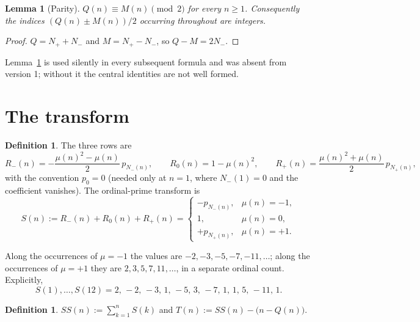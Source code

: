 \documentclass[11pt]{amsart}
\numberwithin{equation}{section}
\theoremstyle{plain}
\newtheorem{lemma}[theorem]{Lemma}
\theoremstyle{definition}
\newtheorem{definition}[theorem]{Definition}
\theoremstyle{remark}
\newcommand{\mob}{\mu}
\newcommand{\Mert}{M}
\newcommand{\Sq}{Q}
\begin{document}
\begin{lemma}[Parity]\label{lem:parity}
$\Sq(n)\equiv \Mert(n)\pmod 2$ for every $n\ge1$. Consequently the indices
$(\Sq(n)\pm\Mert(n))/2$ occurring throughout are integers.
\end{lemma}

\begin{proof}
$\Sq=N_++N_-$ and $\Mert=N_+-N_-$, so $\Sq-\Mert=2N_-$.
\end{proof}

Lemma~\ref{lem:parity} is used silently in every subsequent formula and was
absent from version 1; without it the central identities are not well formed.

\section{The transform}
\label{sec:transform}

\begin{definition}
\label{def:transform}
The three rows are
\begin{equation}
\label{eq:transform-rows}
R_-(n)=-\frac{\mob(n)^2-\mob(n)}2\,p_{N_-(n)},
\qquad
R_0(n)=1-\mob(n)^2,
\qquad
R_+(n)=\frac{\mob(n)^2+\mob(n)}2\,p_{N_+(n)} ,
\end{equation}
with the convention $p_0=0$ (needed only at $n=1$, where $N_-(1)=0$ and the
coefficient vanishes). The ordinal-prime transform is
\begin{equation}
\label{eq:transform-piecewise}
S(n):=R_-(n)+R_0(n)+R_+(n)
=
\begin{cases}
-p_{N_-(n)},&\mob(n)=-1,\\[1mm]
1,&\mob(n)=0,\\[1mm]
+p_{N_+(n)},&\mob(n)=+1 .
\end{cases}
\end{equation}
\end{definition}

Along the occurrences of $\mob=-1$ the values are $-2,-3,-5,-7,-11,\ldots$; along
the occurrences of $\mob=+1$ they are $2,3,5,7,11,\ldots$, in a separate ordinal
count. Explicitly,
\begin{equation}
\label{eq:first-transform-values}
S(1),\ldots,S(12)=2,\,-2,\,-3,\,1,\,-5,\,3,\,-7,\,1,\,1,\,5,\,-11,\,1 .
\end{equation}

\begin{definition}
\label{def:ss-t}
$SS(n):=\sum_{k=1}^{n}S(k)$ and $T(n):=SS(n)-\bigl(n-\Sq(n)\bigr)$.
\end{definition}
\end{document}
